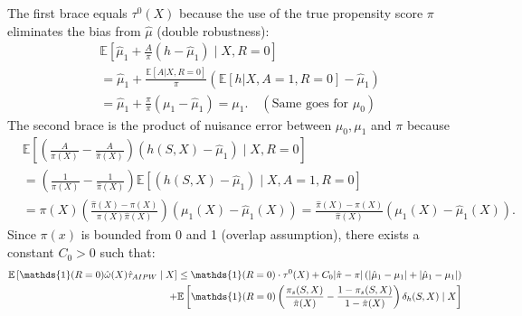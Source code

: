 \documentclass{article}
\theoremstyle{plain}
\theoremstyle{definition}
\theoremstyle{remark}
\newcommand{\E}{\mathbb{E}}                %
\newcommand{\1}{\mathds{1}}                %
\begin{document}
The first brace equals $\tau^0(X)$ because the use of the true propensity score $\pi$ eliminates the bias from $\hat\mu$ (double robustness):
\begin{align} 
&\E\left[ \hat{\mu}_1 + \frac{A}{\pi}(h-\hat\mu_1) \mid X, R=0 \right] \\
&= \hat{\mu}_1 + \frac{\E[A|X,R=0]}{\pi}(\E[h|X,A=1,R=0]-\hat\mu_1) \\ 
&= \hat{\mu}_1 + \frac{\pi}{\pi}(\mu_1-\hat\mu_1) = \mu_1. \quad (\text{Same goes for }\mu_0)
\end{align}
The second brace is the product of nuisance error between $\mu_0,\mu_1$ and $\pi$ because
\begin{align} 
&\E\left[ \left(\frac{A}{\pi(X)} -\frac{A}{\hat\pi(X)}\right)(h(S,X)-\hat{\mu}_1) \mid X, R=0 \right] \\
&=\left(\frac{1}{\pi(X)} -\frac{1}{\hat\pi(X)}\right)\E\left[ (h(S,X)-\hat{\mu}_1) \mid X, A=1,R=0 \right] \\
&= \pi(X) \left(\frac{\hat{\pi}(X) - \pi(X)}{\pi(X)\hat{\pi}(X)}\right) (\mu_1(X) - \hat{\mu}_1(X)) = \frac{\hat{\pi}(X) - \pi(X)}{\hat{\pi}(X)} (\mu_1(X) - \hat{\mu}_1(X)). 
\end{align}
Since $\pi(x)$ is bounded from 0 and 1 (overlap assumption), there exists a constant $C_0 > 0$ such that:
\begin{align}
\label{eq:tauDR-bound}
    \E\left[ \1(R=0) \hat{\omega}(X) \hat{\tau}_{AIPW} \mid X \right] \leq \1(R=0)\cdot\tau^0(X)+ C_0|\hat{\pi}-\pi|\left(|\hat\mu_1-\mu_1|+|\hat\mu_1-\mu_1| \right) \notag \\
    + \E\left[ \1(R=0)\left( \frac{\pi_s(S,X)}{\hat{\pi}(X)} - \frac{1-\pi_s(S,X)}{1-\hat{\pi}(X)} \right) \delta_h(S,X) \mid X\right]
\end{align}
\end{document}
